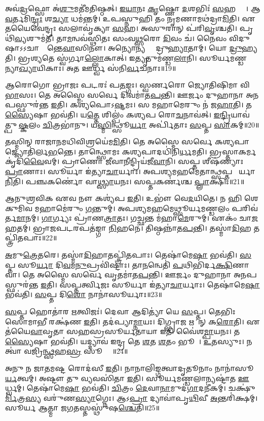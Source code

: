 𑌅𑌵॑\ul{𑌦𑍍𑌰}𑌫𑍍𑌸𑍋 𑌅॑\ul{𑌶𑍁}𑌮𑌤𑍀॑𑌮𑌤𑌿𑌷𑍍𑌠𑌤𑍍‌। \ul{𑌇}\ul{𑌯𑌾}𑌨𑌃 \ul{𑌕𑍃}𑌷𑍍𑌣𑍋 \ul{𑌦}𑌶𑌭𑌿𑌃॑ \ul{𑌸}𑌹𑌸𑍍𑌰𑍈𑌃᳚। 
𑌆\ul{𑌵}𑌰𑍍𑌤𑌮𑌿\ul{𑌨𑍍𑌦𑍍𑌰𑌃} 𑌶\ul{𑌚𑍍𑌯𑌾} 𑌧𑌮॑𑌨𑍍𑌤𑌮𑍍‌। 𑌉𑌪𑌸𑍍𑌨𑍁𑌹𑌿 𑌤𑌂 𑌨𑍃𑌮𑌣𑌾𑌮𑌥॑𑌦𑍍𑌰𑌾\ul{𑌮𑌿}𑌤𑌿। 
𑌏𑌤𑌯𑍈𑌵𑍇𑌨𑍍𑌦𑍍𑌰𑌃 𑌸𑌲𑌾𑌵𑍃॑𑌕𑍍𑌯𑌾 \ul{𑌸}𑌹। 𑌅𑌸𑍁𑌰𑌾𑌨𑍍‌ 𑌪॑𑌰𑌿\ul{𑌵𑍃}𑌶𑍍𑌚𑌤𑌿। 
𑌪𑍃𑌥𑌿॑\ul{𑌵𑍍𑌯}\ul{}𑌶𑍁𑌮॑𑌤𑍀। 𑌤𑌾\ul{𑌮}𑌨𑍍𑌵𑌵॑𑌸𑍍𑌥𑌿𑌤𑌃 𑌸𑌂𑌵\ul{𑌥𑍍𑌸}𑌰𑍋 \ul{𑌦𑌿}𑌵𑌂 𑌚॑। 
𑌨𑍈𑌵𑌂 𑌵𑌿𑌦𑍁𑌷𑌾𑌽𑌽𑌚𑌾𑌰𑍍𑌯𑌾᳚𑌨𑍍𑌤𑍇\ul{𑌵𑌾}𑌸𑌿𑌨𑍗। 𑌅𑌨𑍍𑌯𑍋𑌨𑍍𑌯𑌸𑍍𑌮𑍈᳚ 𑌦𑍍𑌰𑍁\ul{𑌹𑍍𑌯𑌾}𑌤𑌾𑌮𑍍। 𑌯𑍋 \ul{𑌦𑍍𑌰𑍁}𑌹𑍍𑌯𑌤𑌿। 
𑌭𑍍𑌰𑌶𑍍𑌯𑌤𑍇 𑌸𑍍𑌵॑𑌰𑍍𑌗𑌾\ul{𑌲𑍍𑌲𑍋}𑌕𑌾𑌤𑍍‌। 𑌇𑌤𑍍𑌯𑍃𑌤𑍁𑌮॑𑌣𑍍𑌡\ul{𑌲𑌾}𑌨𑌿। 
𑌸𑍂𑌰𑍍𑌯𑌮𑌣𑍍𑌡𑌲𑌾᳚𑌨𑍍𑌯𑌾\-\ul{𑌖𑍍𑌯𑌾}𑌯𑌿𑌕𑌾𑌃। 𑌅𑌤 𑌊𑌰𑍍𑌧𑍍𑌵 𑌸॑𑌨𑌿\ul{𑌰𑍍𑌵}𑌚𑌨𑌾𑌃॥19॥\anuvakamend


𑌆𑌰𑍋𑌗𑍋 𑌭𑍍𑌰𑌾𑌜𑌃 𑌪𑌟𑌰𑌃॑ 𑌪\ul{𑌤}𑌙𑍍𑌗𑌃। 𑌸𑍍𑌵𑌰𑍍𑌣𑌰𑍋 𑌜𑍍𑌯𑍋𑌤𑌿𑌷𑌿𑌮𑌾\sn{} 𑌵𑌿\ul{𑌭𑌾}𑌸𑌃। 
𑌤𑍇 𑌅𑌸𑍍𑌮𑍈 𑌸𑌰𑍍𑌵𑍇 𑌦𑌿𑌵𑌮𑌾॑𑌤\ul{𑌪}𑌨𑍍𑌤𑌿। 𑌊𑌰𑍍𑌜𑌂 𑌦𑍁𑌹𑌾𑌨𑌾 𑌅𑌨𑌪𑌸𑍍𑌫𑍁𑌰॑𑌨𑍍𑌤 \ul{𑌇}𑌤𑌿। 
𑌕𑌶𑍍𑌯॑𑌪𑍋𑌽\ul{𑌷𑍍𑌟}𑌮𑌃। 𑌸 𑌮𑌹𑌾𑌮𑍇𑌰𑍁𑌂 𑌨॑ 𑌜\ul{𑌹𑌾}𑌤𑌿। 
𑌤\ul{𑌸𑍍𑌯𑍈}𑌷𑌾 𑌭𑌵॑𑌤𑌿। 𑌯\ul{𑌤𑍍𑌤𑍇} 𑌶𑌿𑌲𑍍𑌪𑌂॑ 𑌕𑌶𑍍𑌯𑌪 𑌰𑍋\ul{𑌚}𑌨𑌾𑌵॑𑌤𑍍‌। 
\ul{𑌇}\ul{𑌨𑍍𑌦𑍍𑌰𑌿}𑌯𑌾𑌵॑𑌤𑍍𑌪𑍁\ul{𑌷𑍍𑌕}𑌲𑌂 \ul{𑌚𑌿}𑌤𑍍𑌰𑌭𑌾॑𑌨𑍁। 𑌯\ul{𑌸𑍍𑌮𑌿}𑌨𑍍𑌥𑍍𑌸𑍂\ul{𑌰𑍍𑌯𑌾} 𑌅𑌰𑍍𑌪𑌿॑𑌤𑌾𑌃 \ul{𑌸}𑌪𑍍𑌤 \ul{𑌸𑌾}𑌕𑌮𑍍‌॥20॥

𑌤𑌸𑍍𑌮𑌿𑌨𑍍‌ 𑌰𑌾𑌜𑌾𑌨𑌮𑌧𑌿𑌵𑌿𑌶𑍍𑌰𑌯𑍇॑𑌮\ul{𑌮𑌿}𑌤𑌿। 𑌤𑍇 𑌅𑌸𑍍𑌮𑍈 𑌸𑌰𑍍𑌵𑍇 𑌕𑌶𑍍𑌯𑌪𑌾𑌜𑍍𑌜𑍍𑌯𑍋\-𑌤𑌿॑𑌰𑍍𑌲\ul{𑌭}𑌨𑍍𑌤𑍇। 
𑌤𑌾𑌨𑍍𑌥𑍍𑌸𑍋𑌮𑌃 𑌕𑌶𑍍𑌯𑌪𑌾𑌦𑌧𑌿॑𑌨𑌿\ul{𑌰𑍍𑌧}𑌮𑌤𑌿। 𑌭𑍍𑌰𑌸𑍍𑌤𑌾𑌕𑌰𑍍𑌮𑌕𑍃॑𑌦𑌿\ul{𑌵𑍈}𑌵𑌮𑍍‌। 
𑌪𑍍𑌰𑌾𑌣𑍋 𑌜𑍀𑌵𑌾𑌨𑍀𑌨𑍍𑌦𑍍𑌰𑌿𑌯॑𑌜𑍀\ul{𑌵𑌾}𑌨𑌿। 𑌸𑌪𑍍𑌤 𑌶𑍀\ur{}𑌷॑𑌣𑍍𑌯𑌾𑌃 \ul{𑌪𑍍𑌰𑌾}𑌣𑌾𑌃। 
𑌸𑍂𑌰𑍍𑌯𑌾 𑌇॑𑌤𑍍𑌯𑌾\ul{𑌚𑌾}𑌰𑍍𑌯𑌾𑌃। 𑌅𑌪𑌶𑍍𑌯𑌮𑌹𑌮𑍇𑌤𑌾𑌨𑍍𑌥𑍍𑌸𑌪𑍍𑌤 𑌸𑍂᳚𑌰𑍍𑌯𑌾\ul{𑌨𑌿}𑌤𑌿। 
𑌪𑌞𑍍𑌚𑌕𑌰𑍍𑌣𑍋॑ 𑌵𑌾\ul{𑌥𑍍𑌸𑍍𑌯𑌾}𑌯𑌨𑌃। 𑌸𑌪𑍍𑌤𑌕𑌰𑍍𑌣॑𑌶𑍍𑌚 \ul{𑌪𑍍𑌲𑌾}𑌕𑍍𑌷𑌿𑌃॥21॥

𑌆𑌨𑍁𑌶𑍍𑌰𑌵𑌿𑌕 𑌏𑌵 𑌨𑍗 𑌕𑌶𑍍𑌯॑𑌪 \ul{𑌇}𑌤𑌿। 𑌉𑌭𑍗॑ 𑌵𑍇\ul{𑌦}𑌯𑌿𑌤𑍇। 
𑌨 𑌹𑌿 𑌶𑍇𑌕𑍁𑌮𑌿𑌵 𑌮𑌹𑌾𑌮𑍇॑𑌰𑍁𑌂 \ul{𑌗}𑌨𑍍𑌤𑍁𑌮𑍍। 𑌅𑌪𑌶𑍍𑌯𑌮𑌹𑌮𑍇𑌥𑍍𑌸𑍂𑌰𑍍𑌯𑌮𑌣𑍍𑌡𑌲𑌂 𑌪𑌰𑌿𑌵॑𑌰𑍍𑌤\ul{𑌮𑌾}𑌨𑌮𑍍। 
\ul{𑌗𑌾}𑌰𑍍𑌗𑍍𑌯𑌃 𑌪𑍍𑌰𑌾॑𑌣\ul{𑌤𑍍𑌰𑌾}𑌤𑌃। 𑌗𑌚𑍍𑌛𑌨𑍍𑌤 𑌮॑𑌹𑌾\ul{𑌮𑍇}𑌰𑍁𑌮𑍍। 𑌏𑌕𑌂॑ 𑌚𑌾\ul{𑌜}𑌹𑌤𑌮𑍍। 
𑌭𑍍𑌰𑌾𑌜𑌪𑌟𑌰𑌪𑌤॑𑌙𑍍𑌗𑌾 \ul{𑌨𑌿}𑌹𑌨𑍇। 𑌤𑌿𑌷𑍍𑌠𑌨𑍍𑌨𑌾॑𑌤\ul{𑌪}𑌨𑍍𑌤𑌿। 𑌤𑌸𑍍𑌮𑌾॑\ul{𑌦𑌿}𑌹 𑌤𑌪𑍍𑌤𑍍𑌰𑌿॑𑌤𑌪𑌾𑌃॥22॥

\ul{𑌅}𑌮𑍁\ul{𑌤𑍍𑌰𑍇}𑌤𑌰𑍇। 𑌤𑌸𑍍𑌮𑌾॑\ul{𑌦𑌿}𑌹𑌾𑌤𑌪𑍍𑌤𑍍𑌰𑌿॑𑌤𑌪𑌾𑌃। 𑌤𑍇𑌷𑌾॑𑌮𑍇\ul{𑌷𑌾} 𑌭𑌵॑𑌤𑌿। 
\ul{𑌸}𑌪𑍍𑌤 𑌸𑍂\ul{𑌰𑍍𑌯𑌾} 𑌦𑌿\ul{𑌵}𑌮\ul{𑌨𑍁}𑌪𑍍𑌰𑌵𑌿॑𑌷𑍍𑌟𑌾𑌃। 𑌤𑌾\ul{𑌨}𑌨𑍍𑌵𑍇𑌤𑌿॑ \ul{𑌪}𑌥𑌿𑌭𑌿॑𑌰𑍍𑌦\ul{𑌕𑍍𑌷𑌿}𑌣𑌾𑌵𑌾\sn{}। 
𑌤𑍇 𑌅𑌸𑍍𑌮𑍈 𑌸𑌰𑍍𑌵𑍇 𑌘𑍃𑌤𑌮𑌾॑𑌤\ul{𑌪}𑌨𑍍𑌤𑌿। 𑌊𑌰𑍍𑌜𑌂 𑌦𑍁𑌹𑌾𑌨𑌾 𑌅𑌨𑌪𑌸𑍍𑌫𑍁𑌰॑𑌨𑍍𑌤 \ul{𑌇}𑌤𑌿। 
𑌸𑌪𑍍𑌤𑌰𑍍𑌤𑍍𑌵𑌿𑌜𑌃 𑌸𑍂𑌰𑍍𑌯𑌾 𑌇॑𑌤𑍍𑌯𑌾\ul{𑌚𑌾}𑌰𑍍𑌯𑌾𑌃। 𑌤𑍇𑌷𑌾॑𑌮𑍇\ul{𑌷𑌾} 𑌭𑌵॑𑌤𑌿। \ul{𑌸}𑌪𑍍𑌤 𑌦𑌿\ul{𑌶𑍋} 𑌨𑌾𑌨𑌾॑𑌸𑍂𑌰𑍍𑌯𑌾𑌃॥23॥

\ul{𑌸}𑌪𑍍𑌤 𑌹𑍋𑌤𑌾॑𑌰 \ul{𑌋}𑌤𑍍𑌵𑌿𑌜𑌃॑। 𑌦𑍇𑌵𑌾 𑌆𑌦𑌿𑌤𑍍𑌯𑌾॑ 𑌯𑍇 \ul{𑌸}𑌪𑍍𑌤। 
𑌤𑍇𑌭𑌿𑌃 𑌸𑍋𑌮𑌾𑌭𑍀 𑌰𑌕𑍍𑌷॑𑌣 \ul{𑌇}𑌤𑌿। 𑌤𑌦॑𑌪𑍍𑌯𑌾\ul{𑌮𑍍𑌨𑌾}𑌯𑌃। 
𑌦𑌿𑌗𑍍𑌭𑍍𑌰𑌾𑌜 𑌋𑌤𑍂᳚𑌨𑍍‌ 𑌕\ul{𑌰𑍋}𑌤𑌿। 𑌏𑌤॑𑌯𑍈\ul{𑌵𑌾}𑌵𑍃𑌤𑌾 𑌸𑌹𑌸𑍍𑌰𑌸𑍂𑌰𑍍𑌯𑌤𑌾𑌯𑌾 𑌇𑌤𑌿 𑌵𑍈॑𑌶\ul{𑌮𑍍𑌪𑌾}𑌯𑌨𑌃। 
𑌤\ul{𑌸𑍍𑌯𑍈}𑌷𑌾 𑌭𑌵॑𑌤𑌿। 𑌯𑌦𑍍𑌦𑍍𑌯𑌾𑌵॑ 𑌇𑌨𑍍𑌦𑍍𑌰 𑌤𑍇 \ul{𑌶}𑌤 \ul{𑌶}𑌤𑌂 𑌭𑍂𑌮𑍀𑌃᳚। 
\ul{𑌉}𑌤𑌸𑍍𑌯𑍁𑌃। 𑌨𑌤𑍍𑌵𑌾॑ 𑌵𑌜𑍍𑌰𑌿\ul{𑌨𑍍𑌥𑍍𑌸}𑌹\ul{𑌸𑍍𑌰}\ul{} 𑌸𑍂𑌰𑍍𑌯𑌾𑌃᳚॥24॥

𑌅𑌨𑍁 𑌨 𑌜𑌾𑌤𑌮𑌷𑍍𑌟 𑌰𑍋𑌦॑𑌸𑍀 \ul{𑌇}𑌤𑌿। 𑌨𑌾𑌨𑌾𑌲𑌿𑌙𑍍𑌗𑌤𑍍𑌵𑌾𑌦𑍃𑌤𑍂𑌨𑌾𑌂 𑌨𑌾𑌨𑌾॑𑌸𑍂\ul{𑌰𑍍𑌯}𑌤𑍍𑌵𑌮𑍍। 
𑌅𑌷𑍍𑌟𑍗 𑌤𑍁 𑌵𑍍𑌯𑌵𑌸𑌿॑𑌤𑌾 \ul{𑌇}𑌤𑌿। 𑌸𑍂𑌰𑍍𑌯𑌮𑌣𑍍𑌡𑌲𑌾𑌨𑍍𑌯𑌷𑍍𑌟𑌾॑𑌤 \ul{𑌊}𑌰𑍍𑌧𑍍𑌵𑌮𑍍‌। 
𑌤𑍇𑌷𑌾॑𑌮𑍇\ul{𑌷𑌾} 𑌭𑌵॑𑌤𑌿। \ul{𑌚𑌿}𑌤𑍍𑌰𑌂 \ul{𑌦𑍇}𑌵𑌾\ul{𑌨𑌾}𑌮𑍁𑌦॑\ul{𑌗𑌾}𑌦𑌨𑍀॑𑌕𑌮𑍍। 
𑌚𑌕𑍍𑌷𑍁॑\ul{𑌰𑍍𑌮𑌿}𑌤𑍍𑌰\ul{𑌸𑍍𑌯} 𑌵𑌰𑍁॑𑌣\ul{𑌸𑍍𑌯𑌾}𑌗𑍍𑌨𑍇𑌃। 𑌆𑌽\ul{𑌪𑍍𑌰𑌾} 𑌦𑍍𑌯𑌾𑌵𑌾॑𑌪𑍃\ul{𑌥𑌿}𑌵𑍀 \ul{𑌅}𑌨𑍍𑌤𑌰𑌿॑𑌕𑍍𑌷𑌮𑍍। 
𑌸𑍂𑌰𑍍𑌯 𑌆𑌤𑍍𑌮𑌾 𑌜𑌗𑌤𑌸𑍍𑌤𑌸𑍍𑌥𑍁॑𑌷\ul{𑌶𑍍𑌚𑍇}𑌤𑌿॥25॥\anuvakamend


